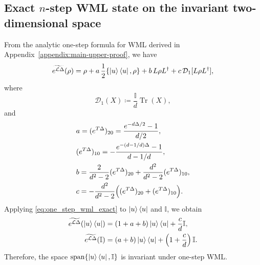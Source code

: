 \documentclass[superscriptaddress,amsmath,amssymb,aps,pra,letterpaper,tightenlines,notitlepages,12pt]{revtex4-2}
\begin{document}
\subsection{Exact $n$-step WML state on the invariant two-dimensional space}
From the analytic one-step formula for WML derived in Appendix~\ref{appendix:main-upper-proof}, we have
\begin{equation}
\widetilde{e^{\mathcal L\Delta}}(\rho) = \rho + a\,\frac{1}{2}\{\ket{u}\bra{u},\rho\}
+ b\,L\rho L^\dagger + c\,\mathcal D_1[L\rho L^\dagger],
\label{eq:one_step_wml_exact}
\end{equation}
where
\begin{equation}
\mathcal D_1(X)\coloneqq \frac{\mathbb I}{d}\operatorname{Tr}(X),
\end{equation}
and
\begin{align}
&a = (e^{T\Delta})_{20} = \frac{e^{-d\Delta/2}-1}{d/2}, \\
&(e^{T\Delta})_{10} =
-\frac{e^{-(d-1/d)\Delta}-1}{d-1/d}, \\
&b= \frac{2}{d^2-2}(e^{T\Delta})_{20}
+ \frac{d^2}{d^2-2}(e^{T\Delta})_{10}, \\
&c= -\frac{d^2}{d^2-2}\Bigl((e^{T\Delta})_{20}+(e^{T\Delta})_{10}\Bigr).
\end{align}
Applying \eqref{eq:one_step_wml_exact} to $\ket{u}\bra{u}$ and $\mathbb I$, we obtain
\begin{align}
\widetilde{e^{\mathcal L\Delta}}(\ket{u}\bra{u})
&=(1+a+b)\ket{u}\bra{u}+\frac{c}{d}\mathbb I, \\
\widetilde{e^{\mathcal L\Delta}}(\mathbb I)
&=(a+b)\ket{u}\bra{u}+\left(1+\frac cd\right)\mathbb I.
\end{align}
Therefore, the space $\operatorname{span}\{\ket{u}\bra{u},\mathbb I\}$ is invariant under one-step WML.
\end{document}

